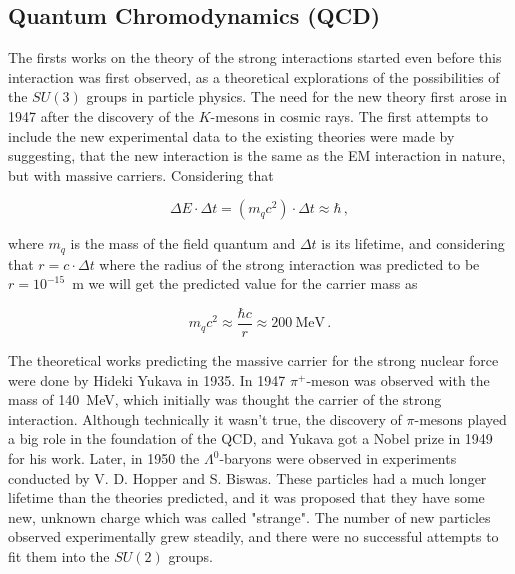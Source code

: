\subsection{Quantum Chromodynamics (QCD)}

The firsts works on the theory of the strong interactions started even before this interaction was first observed, as a theoretical explorations of the possibilities of the $SU(3)$ groups in particle physics. The need for the new theory first arose in 1947 after the discovery of the $K$-mesons in cosmic rays. The first attempts to include the new experimental data to the existing theories were made by suggesting, that the new interaction is the same as the EM interaction in nature, but with massive carriers. Considering that

\begin{equation}
\Delta E \cdot \Delta t = (m_{q}c^{2}) \cdot \Delta t \approx \hbar \,,
\end{equation}

where $m_{q}$ is the mass of the field quantum and $\Delta t$ is its lifetime, and considering that $r = c \cdot \Delta t$ where the radius of the strong interaction was predicted to be $r = 10^{-15}$~m we will get the predicted value for the carrier mass as

\begin{equation}
m_{q}c^{2} \approx \frac{\hbar c}{r} \approx 200 \: \mbox{MeV}\,.
\end{equation}

The theoretical works predicting the massive carrier for the strong nuclear force were done by Hideki Yukava in 1935. In 1947 $\pi^{+}$-meson was observed with the mass of 140~MeV, which initially was thought the carrier of the strong interaction. Although technically it wasn't true, the discovery of $\pi$-mesons played a big role in the foundation of the QCD, and Yukava got a Nobel prize in 1949 for his work. Later, in 1950 the $\Lambda^{0}$-baryons were observed in experiments conducted by V. D. Hopper and S. Biswas. These particles had a much longer lifetime than the theories predicted, and it was proposed that they have some new, unknown charge which was called "strange". The number of new particles observed experimentally grew steadily, and there were no successful attempts to fit them into the $SU(2)$ groups.


